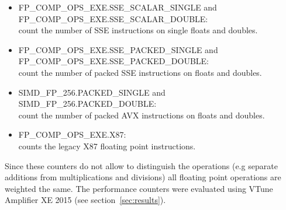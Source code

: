 \begin{itemize}
	\item FP\_COMP\_OPS\_EXE.SSE\_SCALAR\_SINGLE and \\FP\_COMP\_OPS\_EXE.SSE\_SCALAR\_DOUBLE:\\count the number of SSE instructions on single floats and doubles.
	\item FP\_COMP\_OPS\_EXE.SSE\_PACKED\_SINGLE and \\FP\_COMP\_OPS\_EXE.SSE\_PACKED\_DOUBLE:\\count the number of packed SSE instructions on floats and doubles.
	\item SIMD\_FP\_256.PACKED\_SINGLE and \\SIMD\_FP\_256.PACKED\_DOUBLE:\\count the number of packed AVX instructions on floats and doubles.
	\item FP\_COMP\_OPS\_EXE.X87:\\counts the legacy X87 floating point instructions.
\end{itemize}

Since these counters do not allow to distinguish the operations (e.g separate additions from multiplications and divisions) all floating point operations are weighted the same. The performance counters were evaluated using VTune Amplifier XE 2015 (see section~\ref{sec:results}).

%
%
%
